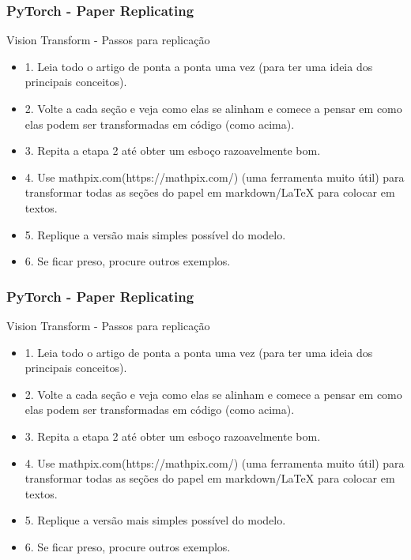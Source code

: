 \documentclass{beamer}
\begin{document}
\begin{frame}
	\frametitle{PyTorch - Paper Replicating}
	\begin{block}{Vision Transform - Passos para replicação}
		\begin{itemize}
			\item 1. Leia todo o artigo de ponta a ponta uma vez (para ter uma ideia dos principais conceitos).
			\item 2. Volte a cada seção e veja como elas se alinham e comece a pensar em como elas podem ser transformadas em código (como acima).
			\item 3. Repita a etapa 2 até obter um esboço razoavelmente bom.
			\item 4. Use mathpix.com(https://mathpix.com/) (uma ferramenta muito útil) para transformar todas as seções do papel em markdown/LaTeX para colocar em textos.
			\item 5. Replique a versão mais simples possível do modelo.
			\item 6. Se ficar preso, procure outros exemplos.
		\end{itemize}
	\end{block}
\end{frame}
\begin{frame}
	\frametitle{PyTorch - Paper Replicating}
	\begin{block}{Vision Transform - Passos para replicação}
		\begin{itemize}
			\item 1. Leia todo o artigo de ponta a ponta uma vez (para ter uma ideia dos principais conceitos).
			\item 2. Volte a cada seção e veja como elas se alinham e comece a pensar em como elas podem ser transformadas em código (como acima).
			\item 3. Repita a etapa 2 até obter um esboço razoavelmente bom.
			\item 4. Use mathpix.com(https://mathpix.com/) (uma ferramenta muito útil) para transformar todas as seções do papel em markdown/LaTeX para colocar em textos.
			\item 5. Replique a versão mais simples possível do modelo.
			\item 6. Se ficar preso, procure outros exemplos.
		\end{itemize}
	\end{block}
\end{frame}
\end{document}
